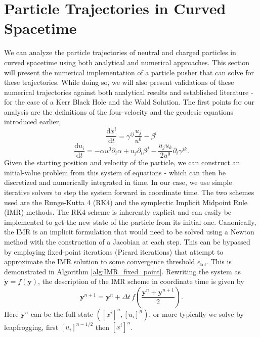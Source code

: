\documentclass{article}
\begin{document}
\section{Particle Trajectories in Curved Spacetime}
We can analyze the particle trajectories of neutral and charged particles in curved spacetime using both analytical and numerical approaches. This section will present the numerical implementation of a particle pusher that can solve for these trajectories. While doing so, we will also present validations of these numerical trajectories against both analytical results and established literature - for the case of a Kerr Black Hole and the Wald Solution. The first points for our analysis are the definitions of the four-velocity and the geodesic equations introduced earlier,
\begin{equation}
    \frac{\text{d}x^i}{\text{d}t} = \gamma^{ij}\frac{u_j}{u^0} - \beta^i
    \label{eq:velocityEinsteinNotation}
\end{equation}
\begin{equation}
    \frac{\text{d}u_i}{\text{d}t} = -\alpha u^0\partial_i\alpha + u_j\partial_i\beta^j - \frac{u_ju_k}{2u^0}\partial_i\gamma^{jk}.
    \label{eq:geodesicEinsteinNotation}
\end{equation}
Given the starting position and velocity of the particle, we can construct an initial-value problem from this system of equations - which can then be discretized and numerically integrated in time. In our case, we use simple iterative solvers to step the system forward in coordinate time. The two schemes used are the Runge-Kutta 4 (RK4) and the symplectic Implicit Midpoint Rule (IMR) methods. The RK4 scheme is inherently explicit and can easily be implemented to get the new state of the particle from its initial one. Canonically, the IMR is an implicit formulation that would need to be solved using a Newton method with the construction of a Jacobian at each step. This can be bypassed by employing fixed-point iterations (Picard iterations) that attempt to approximate the IMR solution to some convergence threshold $\epsilon_\mathrm{tol}$. This is demonstrated in Algorithm \ref{alg:IMR_fixed_point}.
Rewriting the system as $\dot{\bm{y}} = f(\bm{y})$, the description of the IMR scheme in coordinate time is given by
\begin{equation}
    \bm{y}^{n+1} = \bm{y}^n + \Delta t\, f\!\left(\frac{\bm{y}^n + \bm{y}^{n+1}}{2}\right).
\end{equation}
Here $\bm{y}^n$ can be the full state $([x^i]^n,[u_i]^n)$, or more typically we solve by leapfrogging, first $[u_i]^{n-1/2}$ then $[x^i]^{n}$.\medskip
\end{document}

